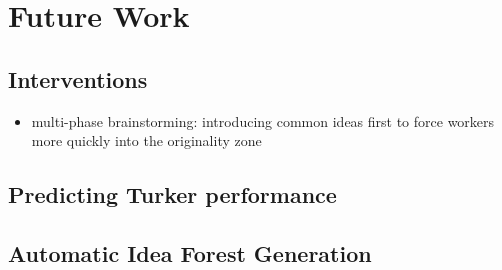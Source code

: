\section{Future Work}

\subsection{Interventions}

\begin{itemize}
\item multi-phase brainstorming: introducing common ideas first to force workers more quickly into the originality zone
\end{itemize}

\subsection{Predicting Turker performance}

\subsection{Automatic Idea Forest Generation}